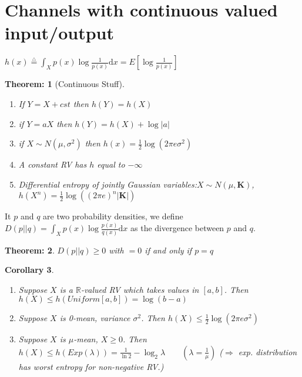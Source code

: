 \documentclass[11pt, a4paper]{scrartcl}
\newtheorem{theorem}{Theorem:}[section]
\newtheorem{corollary}[theorem]{Corollary}
\newenvironment{definition}[1][Definition]{\begin{trivlist}
\item[\hskip \labelsep {\bfseries #1}]}{\end{trivlist}}
\begin{document}
\newcommand{\eqdef}{ \overset{\underset{\mathrm{\triangle}}{}}{=} }

\section{Channels with continuous valued input/output}
\begin{definition} $h(x) \eqdef \int_X p(x) \log \frac 1{p(x)} \mathrm{d}x = E[\log \frac 1{p(x)}]$
\end{definition}

\begin{theorem}[Continuous Stuff] 
\begin{enumerate}
\item If $Y=X+cst $ then $h(Y) =h(X)$
\item if $Y=aX$ then $h(Y) = h(X) +\log |a|$
\item if $X \sim N(\mu, \sigma^2)$ then $h(x) =\frac12 \log (2\pi e \sigma^2)$
\item A constant RV has $h$ equal to $-\infty$
\item Differential entropy of jointly Gaussian variables:$X \sim N(\mu, \mathbf K)$,  $h(X^n)=\frac{1}{2} \log \left ( (2\pi e)^n |\mathbf K| \right )$
\end{enumerate}
\end{theorem}

\newcommand{\dpq}{D(p||q)}

\begin{definition} It $p$ and $q$ are two probability densities, we define $\dpq =  \int_X p(x) \log \frac {p(x)}{q(x)} \mathrm{d}x $ as the divergence between $p$ and $q$. 
\end{definition}

\begin{theorem} $\dpq \geq 0$ with $=0$ if and only if $p=q$
\end{theorem}

\begin{corollary} \begin{enumerate}
\item Suppose $X$ is a $\mathbb R$-valued RV which takes values in $[a,b]$. Then $h(X) \leq h(Uniform[a,b])=\log(b-a)$
\item Suppose $X$ is 0-mean, variance $\sigma^2$. Then  $h(X) \leq
  \frac 12 \log (2\pi e\sigma^2)$
\item Suppose $X$ is $\mu$-mean, $X \ge 0$. Then $h(X) \leq
  h(Exp(\lambda)) = \frac 1 {\ln 2} - \log_2 \lambda \qquad (\lambda = \frac 1\mu)$ ($\Rightarrow$ exp. distribution has worst entropy for non-negative RV.)
\end{enumerate} \end{corollary}
\end{document}
